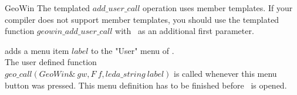 \begin{ccRefClass}{GeoWin}
\medskip
The templated $add\_user\_call$ operation uses member templates. If your 
compiler does not support member templates, you should use
the templated function $geowin\_add\_user\_call$ with
\ccVar\ as an additional first parameter.

{adds a menu item $label$ to the "User" menu of \ccVar . \\
The user defined function \\
$geo\_call(GeoWin\& \ gw, F \ f, leda\_string \ label)$
is called whenever this menu button was pressed. This menu 
definition has to be finished before \ccVar\ is opened. }

\end{ccRefClass}


